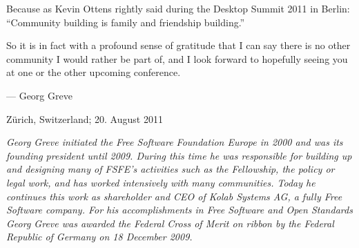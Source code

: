 Because as Kevin Ottens rightly said during the Desktop Summit 2011 in
Berlin: ``Community building is family and friendship building.''

So it is in fact with a profound sense of gratitude that I can say
there is no other community I would rather be part of, and I look
forward to hopefully seeing you at one or the other upcoming
conference.
\newline
\begin{flushright}--- Georg Greve\end{flushright}
\begin{flushright}Zürich, Switzerland; 20. August 2011\end{flushright}

\textit{Georg Greve initiated the Free Software Foundation Europe in
2000 and was its founding president until 2009. During this time he
was responsible for building up and designing many of FSFE's activities
such as the Fellowship, the policy or legal work, and has worked
intensively with many communities. Today he continues this work as
shareholder and CEO of Kolab Systems AG, a fully Free Software company.
For his accomplishments in Free Software and Open Standards Georg
Greve was awarded the Federal Cross of Merit on ribbon by the Federal
Republic of Germany on 18 December 2009.}

\newpage
